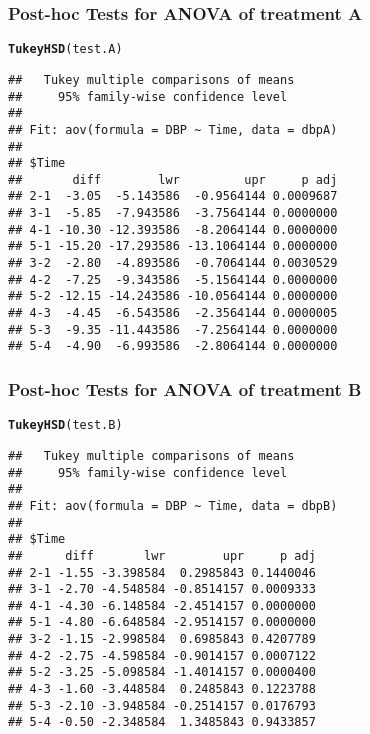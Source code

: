 \documentclass[table,10pt]{beamer}\usepackage[]{graphicx}\usepackage[]{color}
\makeatletter
\newcommand{\hlstd}[1]{\textcolor[rgb]{0.345,0.345,0.345}{#1}}%
\newcommand{\hlkwd}[1]{\textcolor[rgb]{0.737,0.353,0.396}{\textbf{#1}}}%
\newenvironment{kframe}{%
 \def\at@end@of@kframe{}%
 \ifinner\ifhmode%
  \def\at@end@of@kframe{\end{minipage}}%
  \begin{minipage}{\columnwidth}%
 \fi\fi%
 \def\FrameCommand##1{\hskip\@totalleftmargin \hskip-\fboxsep
 \colorbox{shadecolor}{##1}\hskip-\fboxsep
     \hskip-\linewidth \hskip-\@totalleftmargin \hskip\columnwidth}%
 \MakeFramed {\advance\hsize-\width
   \@totalleftmargin\z@ \linewidth\hsize
   \@setminipage}}%
 {\par\unskip\endMakeFramed%
 \at@end@of@kframe}
\newenvironment{knitrout}{}{} %
\makeatother
\begin{document}
\begin{CJK*}{UTF8}{gbsn}
\begin{frame}[t,containsverbatim]
\frametitle{Post-hoc Tests for ANOVA of treatment A}
\begin{knitrout}\footnotesize
{}\color{fgcolor}\begin{kframe}
\begin{alltt}
\hlkwd{TukeyHSD}\hlstd{(test.A)}
\end{alltt}
\begin{verbatim}
##   Tukey multiple comparisons of means
##     95% family-wise confidence level
## 
## Fit: aov(formula = DBP ~ Time, data = dbpA)
## 
## $Time
##       diff        lwr         upr     p adj
## 2-1  -3.05  -5.143586  -0.9564144 0.0009687
## 3-1  -5.85  -7.943586  -3.7564144 0.0000000
## 4-1 -10.30 -12.393586  -8.2064144 0.0000000
## 5-1 -15.20 -17.293586 -13.1064144 0.0000000
## 3-2  -2.80  -4.893586  -0.7064144 0.0030529
## 4-2  -7.25  -9.343586  -5.1564144 0.0000000
## 5-2 -12.15 -14.243586 -10.0564144 0.0000000
## 4-3  -4.45  -6.543586  -2.3564144 0.0000005
## 5-3  -9.35 -11.443586  -7.2564144 0.0000000
## 5-4  -4.90  -6.993586  -2.8064144 0.0000000
\end{verbatim}
\end{kframe}
\end{knitrout}
\end{frame}


\begin{frame}[t,containsverbatim]
\frametitle{Post-hoc Tests for ANOVA of treatment B}
\begin{knitrout}\footnotesize
{}\color{fgcolor}\begin{kframe}
\begin{alltt}
\hlkwd{TukeyHSD}\hlstd{(test.B)}
\end{alltt}
\begin{verbatim}
##   Tukey multiple comparisons of means
##     95% family-wise confidence level
## 
## Fit: aov(formula = DBP ~ Time, data = dbpB)
## 
## $Time
##      diff       lwr        upr     p adj
## 2-1 -1.55 -3.398584  0.2985843 0.1440046
## 3-1 -2.70 -4.548584 -0.8514157 0.0009333
## 4-1 -4.30 -6.148584 -2.4514157 0.0000000
## 5-1 -4.80 -6.648584 -2.9514157 0.0000000
## 3-2 -1.15 -2.998584  0.6985843 0.4207789
## 4-2 -2.75 -4.598584 -0.9014157 0.0007122
## 5-2 -3.25 -5.098584 -1.4014157 0.0000400
## 4-3 -1.60 -3.448584  0.2485843 0.1223788
## 5-3 -2.10 -3.948584 -0.2514157 0.0176793
## 5-4 -0.50 -2.348584  1.3485843 0.9433857
\end{verbatim}
\end{kframe}
\end{knitrout}
\end{frame}



\end{CJK*}
\end{document}
